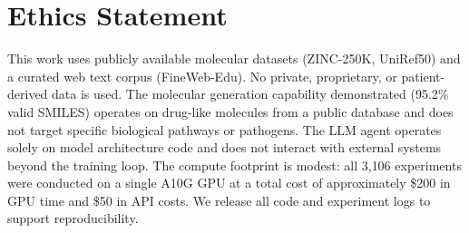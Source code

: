 \section*{Ethics Statement}
\label{sec:ethics}

This work uses publicly available molecular datasets (ZINC-250K, UniRef50) and a curated web text corpus (FineWeb-Edu). No private, proprietary, or patient-derived data is used. The molecular generation capability demonstrated (95.2\% valid SMILES) operates on drug-like molecules from a public database and does not target specific biological pathways or pathogens. The LLM agent operates solely on model architecture code and does not interact with external systems beyond the training loop. The compute footprint is modest: all 3{,}106 experiments were conducted on a single A10G GPU at a total cost of approximately \$200 in GPU time and \$50 in API costs. We release all code and experiment logs to support reproducibility.
